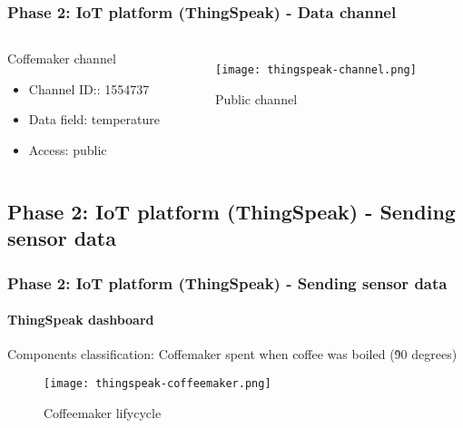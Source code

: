 \documentclass[
    aspectratio=169,                   %
]{beamer}
\begin{document}
    \begin{frame}
        \frametitle{Phase 2: IoT platform (ThingSpeak) - Data channel}

        \begin{columns}[T,onlytextwidth]
              \begin{block}{Coffemaker channel}
                \begin{itemize}
                    \item \alert{Channel ID:}: 1554737
                    \item \alert{Data field}: temperature
                    \item \alert{Access}: public
                \end{itemize}
              \end{block}
            \begin{figure}
                \centering
                \begin{stampbox}
                    \texttt{[image: thingspeak-channel.png]}
                \end{stampbox}
                \caption{Public channel}
            \end{figure}        
        \end{columns}

    \end{frame}

\subsection{Phase 2: IoT platform (ThingSpeak) - Sending sensor data}

    \begin{frame}
        \frametitle{Phase 2: IoT platform (ThingSpeak) - Sending sensor data}

        \paragraph{ThingSpeak dashboard} Components classification:
            Coffemaker spent when coffee was boiled (\~90 degrees)

        \begin{figure}
            \centering
            \begin{stampbox}
                \texttt{[image: thingspeak-coffeemaker.png]}
            \end{stampbox}
            \caption{Coffeemaker lifycycle}
        \end{figure}
        
    \end{frame}
\end{document}
